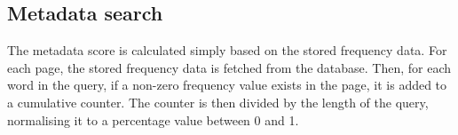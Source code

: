 \subsection{Metadata search}

The metadata score is calculated simply based on the stored frequency data.
For each page, the stored frequency data is fetched from the database.
Then, for each word in the query, if a non-zero frequency value exists in the page, it is added to a cumulative counter.
The counter is then divided by the length of the query, normalising it to a percentage value between 0 and 1.
